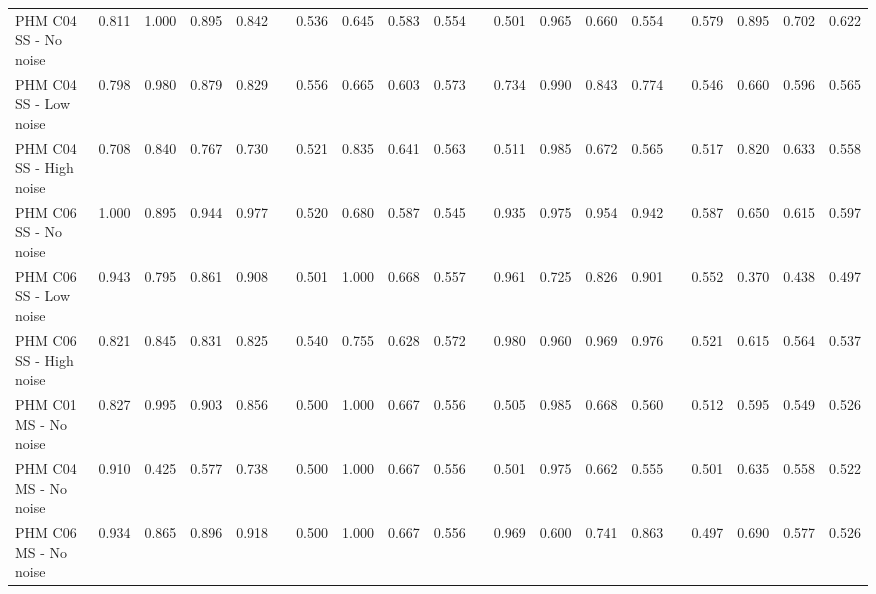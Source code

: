 \documentclass[referee, sn-mathphys-num]{sn-jnl}
\begin{document}
\begin{appendices}
\begin{sidewaystable}
{\begin{tabular}{@{}l| rrrr @{}c| rrrr @{}c| rrrr @{}c| rrrr@{}}
					PHM C04 SS - No noise &\textcolor{dblue}{0.811} &\textcolor{dblue}{1.000} &\textcolor{dblue}{0.895} & \textcolor{dblue}{0.842} & & 0.536 &0.645 &0.583 &0.554 & &0.501 &0.965 &0.660 &0.554 & &0.579 &0.895 &0.702&0.622\\
					PHM C04 SS - Low noise &\textcolor{dblue}{0.798} &0.980 &\textcolor{dblue}{0.879} & \textcolor{dblue}{0.829} & & 0.556 &0.665 &0.603 &0.573 & &0.734 &\textcolor{dblue}{0.990} &0.843 &0.774 & &0.546 &0.660 &0.596&0.565\\
					PHM C04 SS - High noise &\textcolor{dblue}{0.708} &0.840 &\textcolor{dblue}{0.767} & \textcolor{dblue}{0.730} & & 0.521 &0.835 &0.641 &0.563 & &0.511 &\textcolor{dblue}{0.985} &0.672 &0.565 & &0.517 &0.820 &0.633&0.558\\\hdashline
					
					PHM C06 SS - No noise &\textcolor{dblue}{1.000} &\textcolor{dblue}{0.895} &\textcolor{dblue}{0.944} & \textcolor{dblue}{0.977} & & 0.520 &0.680 &0.587 &0.545 & &0.935 &0.975 &0.954 &0.942 & &0.587 &0.650 &0.615&0.597\\
					PHM C06 SS - Low noise &\textcolor{dblue}{0.943} &0.795 &\textcolor{dblue}{0.861} & \textcolor{dblue}{0.908} & & 0.501 &\textcolor{dblue}{1.000} &0.668 &0.557 & &0.961 &0.725 &0.826 &0.901 & &0.552 &0.370 &0.438&0.497\\
					PHM C06 SS - High noise &0.821 &0.845 &0.831 & 0.825 & & 0.540 &0.755 &0.628 &0.572 & &\textcolor{dblue}{0.980} &\textcolor{dblue}{0.960}&\textcolor{dblue}{0.969} &\textcolor{dblue}{0.976} & &0.521 &0.615 &0.564&0.537\\\midrule
					
					PHM C01 MS - No noise &\textcolor{dblue}{0.827} &0.995 &\textcolor{dblue}{0.903} & \textcolor{dblue}{0.856} & & 0.500 &\textcolor{dblue}{1.000} &0.667 &0.556 & &0.505 &0.985 &0.668 &0.560 & &0.512 &0.595 &0.549&0.526\\
					PHM C04 MS - No noise &\textcolor{dblue}{0.910}&0.425 &0.577 & \textcolor{dblue}{0.738} & & 0.500 &\textcolor{dblue}{1.000} &\textcolor{dblue}{0.667} &0.556 & &0.501 &0.975 &0.662 &0.555 & &0.501 &0.635 &0.558&0.522\\
					PHM C06 MS - No noise &\textcolor{dblue}{0.934} &0.865 &\textcolor{dblue}{0.896} & \textcolor{dblue}{0.918} & & 0.500 &\textcolor{dblue}{1.000} &0.667 &0.556 & &0.969 &0.600 &0.741 &0.863 & &0.497 &0.690 &0.577&0.526\\			
					\bottomrule
				\end{tabular}			
			}
		\end{sidewaystable}
		

\end{appendices}
\end{document}
